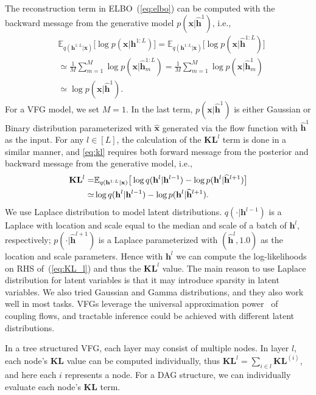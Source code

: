 \documentclass[twoside]{article}
\begin{document}
The reconstruction term in ELBO~(\ref{eq:elbo}) can be computed with the backward message from the generative model $p(\mathbf{x}| \widehat{\mathbf{h}}^{1})$, i.e.,
\begin{align*} 
&\mathbb{E}_{q(\mathbf{h}^{1:L}|\mathbf{x})}\big[ \log p(\mathbf{x}|\mathbf{h}^{1:L})\big]
=\mathbb{E}_{q(\mathbf{h}^{1:L}|\mathbf{x})}\big[ \log p(\mathbf{x}|\widehat{\mathbf{h}}^{1:L})  \big] \\
&\simeq \frac{1}{M}\sum_{m=1}^M \log p(\mathbf{x}| \widehat{\mathbf{h}}^{1:L}_m) = \frac{1}{M}\sum_{m=1}^M \log p(\mathbf{x}| \widehat{\mathbf{h}}^{1}_m)\\ & \simeq   \log p(\mathbf{x}| \widehat{\mathbf{h}}^{1}) .
 \end{align*}
For a VFG model, we set $M=1$. In the last term,  $p(\mathbf{x}| \widehat{\mathbf{h}}^{1})$ is either Gaussian or Binary distribution parameterized with $\widehat{\mathbf{x}}$ generated via the flow function with $\widehat{\mathbf{h}}^{1}$ as the input.  For any $l \in [L]$, the calculation of the $\mathbf{KL}^l$ term is done in a similar manner, and  \eqref{eq:kl} requires  both  forward message  from  the posterior and backward message from the generative model, i.e.,
\begin{align}\label{eq:KL_l}
\mathbf{KL}^l=&\mathbb{E}_{q(\mathbf{h}^{1:L}|\mathbf{x})}\big[  \log q(\mathbf{h}^{l}|\mathbf{h}^{l-1})   - \log p(\mathbf{h}^{l}|\widehat{\mathbf{h}}^{l+1}) \big] \\ \notag
\simeq & \log q(\mathbf{h}^{l}|\mathbf{h}^{l-1})   - \log p(\mathbf{h}^{l}|\widehat{\mathbf{h}}^{l+1}).
\end{align} 
We use Laplace distribution to model latent distributions. $q(\cdot|\mathbf{h}^{l-1})$ is a Laplace with location and scale equal to the median and scale of a batch of $\mathbf{h}^{l}$, respectively; $p(\cdot|\widehat{\mathbf{h}}^{l+1})$ is a  Laplace parameterized  with  $(\widehat{\mathbf{h}}^{l}, 1.0)$ as the location and scale parameters. Hence with $\mathbf{h}^{l}$ we can compute the log-likelihoods on RHS of~(\ref{eq:KL_l}) and thus the $\mathbf{KL}^l$ value. The main reason to use Laplace distribution for latent variables is that it may introduce sparsity in latent variables. We also tried Gaussian and Gamma distributions, and they also work well in most tasks. VFGs leverage the universal approximation power~\cite{teshima2020coupling} of coupling flows, and tractable inference could be achieved with different latent distributions. 


In a tree structured VFG, each layer may consist of multiple nodes. In layer $l$, each node's  $\mathbf{KL}$ value can be  computed individually, thus $\mathbf{KL}^l = \sum_{i\in l} \mathbf{KL}^{(i)}$, and here each $i$ represents a node. For a DAG structure, we can individually evaluate each node's $\mathbf{KL}$ term. 
\end{document}
